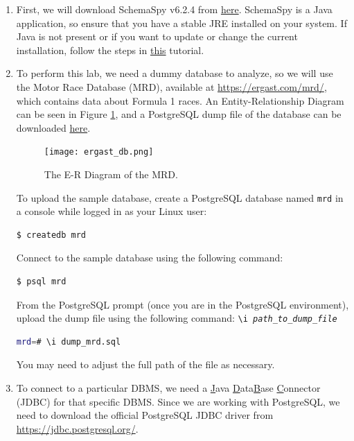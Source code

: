 \documentclass{article}
\begin{document}
\begin{enumerate}
    \item First, we will download SchemaSpy v6.2.4 from \href{https://github.com/schemaspy/schemaspy/releases/tag/v6.2.4}{here}. SchemaSpy is a Java application, so ensure that you have a stable JRE installed on your system. If Java is not present or if you want to update or change the current installation, follow the steps in \href{https://www.linuxcloudvps.com/blog/install-java-lts-on-ubuntu-24-04/}{this} tutorial.
 
    \item To perform this lab, we need a dummy database to analyze, so we will use the Motor Race Database (MRD), available at \url{https://ergast.com/mrd/}, which contains data about Formula 1 races. An Entity-Relationship Diagram can be seen in Figure \ref{fig:erd}, and a PostgreSQL dump file of the database can be downloaded \href{https://drive.google.com/file/d/1ARHlgpcgQ0nddTUFsQqdevDfFYbGPd6d/view?usp=sharing}{here}.

    \begin{figure}[t]
        \texttt{[image: ergast\_db.png]}
        \caption{The E-R Diagram of the MRD.}
        \label{fig:erd}
    \end{figure}

    To upload the sample database, create a PostgreSQL database named \texttt{mrd} in a console while logged in as your Linux user:
 
    \begin{lstlisting}[language=bash]
    $ createdb mrd
    \end{lstlisting}

    Connect to the sample database using the following command:

    \begin{lstlisting}[language=bash]
    $ psql mrd
    \end{lstlisting}

    From the PostgreSQL prompt (once you are in the PostgreSQL environment), upload the dump file using the following command: \texttt{\textbackslash i \textit{path\_to\_dump\_file}}

    \begin{lstlisting}[language=bash]
    mrd=# \i dump_mrd.sql
    \end{lstlisting}

    You may need to adjust the full path of the file as necessary.

    \item To connect to a particular DBMS, we need a \underline{J}ava \underline{D}ata\underline{B}ase \underline{C}onnector (JDBC) for that specific DBMS. Since we are working with PostgreSQL, we need to download the official PostgreSQL JDBC driver from \url{https://jdbc.postgresql.org/}.


\end{enumerate}
\end{document}
